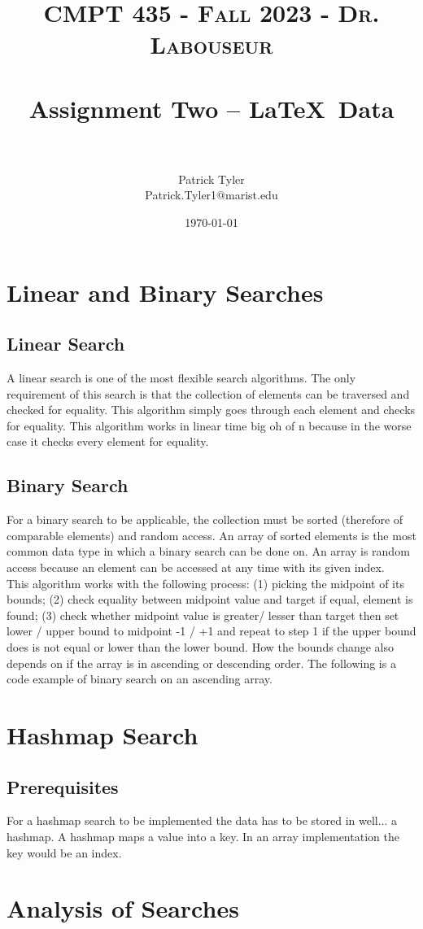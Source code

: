 \documentclass[letterpaper, 10pt]{article}
\title{	
   \normalfont \normalsize 
   \textsc{CMPT 435 - Fall 2023 - Dr. Labouseur} \\[10pt] %
   \horrule{0.5pt} \\[0.25cm] 	%
   \huge Assignment Two -- \LaTeX ~Data\\     	    %
   \horrule{0.5pt} \\[0.25cm] 	%
}
\author{Patrick Tyler \\ \normalsize Patrick.Tyler1@marist.edu}
\date{\normalsize\today} 	%
\begin{document}
\maketitle %


\section{Linear and Binary Searches}
\subsection{Linear Search}
A linear search is one of the most flexible search algorithms. The only requirement of this search is that
the collection of elements can be traversed and checked for equality. This algorithm simply goes through
each element and checks for equality. This algorithm works in linear time big oh of n because in the worse
case it checks every element for equality.
\subsection{Binary Search}
For a binary search to be applicable, the collection must be sorted (therefore of comparable elements)
and random access. An array of sorted elements is the most common data type in which a binary search
can be done on. An array is random access because an element can be accessed at any time with its
given index.\\
\newline
This algorithm works with the following process: (1) picking the midpoint of its bounds;
(2) check equality between midpoint value and target if equal, element is found;
(3) check whether midpoint value is greater/ lesser than target then set lower / upper bound to
midpoint -1 / +1 and repeat to step 1 if the upper bound does is not equal or lower than the lower bound. 
How the bounds change also depends on if the array is in ascending or descending order.
The following is a code example of binary search on an ascending array.
\section{Hashmap Search}
\subsection{Prerequisites}
For a hashmap search to be implemented the data has to be stored in well... a hashmap. A hashmap maps
a value into a key. In an array implementation the key would be an index. 
\section{Analysis of Searches}
\end{document}
